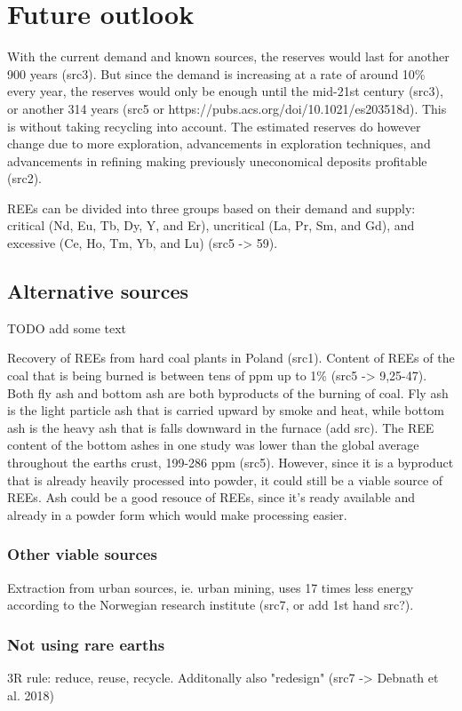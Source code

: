 
\section{Future outlook}

With the current demand and known sources, the reserves would last for another 900 years (src3). But since the demand is increasing at a rate of around 10\% every year, the reserves would only be enough until the mid-21st century (src3), or another 314 years (src5 or https://pubs.acs.org/doi/10.1021/es203518d). This is without taking recycling into account. The estimated reserves do however change due to more exploration, advancements in exploration techniques, and advancements in refining making previously uneconomical deposits profitable (src2).

REEs can be divided into three groups based on their demand and supply: critical (Nd, Eu,
Tb, Dy, Y, and Er), uncritical (La, Pr, Sm, and Gd), and excessive (Ce, Ho, Tm, Yb, and Lu) (src5 -> 59).

\subsection{Alternative sources}
TODO add some text


Recovery of REEs from hard coal plants in Poland (src1). Content of REEs of the coal that is being burned is between tens of ppm up to 1\% (src5 -> 9,25-47). Both fly ash and bottom ash are both byproducts of the burning of coal. Fly ash is the light particle ash that is carried upward by smoke and heat, while bottom ash is the heavy ash that is falls downward in the furnace (add src). The REE content of the bottom ashes in one study was lower than the global average throughout the earths crust, 199-286 ppm (src5). However, since it is a byproduct that is already heavily processed into powder, it could still be a viable source of REEs. Ash could be a good resouce of REEs, since it's ready available and already in a powder form which would make processing easier.

\subsubsection{Other viable sources}

Extraction from urban sources, ie. urban mining, uses 17 times less energy according to the Norwegian research institute (src7, or add 1st hand src?).

\subsubsection{Not using rare earths}

3R rule: reduce, reuse, recycle. Additonally also "redesign" (src7 -> Debnath et al. 2018)


